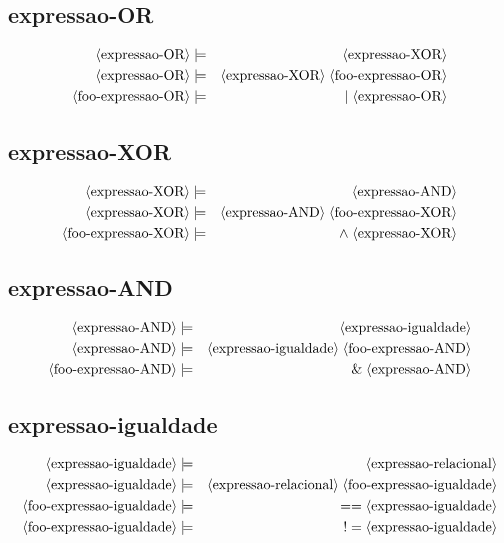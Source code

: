 \documentclass[12pt,a4papper]{article}
\newcommand{\pn}[1]{\langle \textnormal{#1} \rangle}
\newcommand{\pp}{\models}
\newcommand{\ww}{\;}
\newcommand{\sm}[1]{\textnormal{#1}}
\begin{document}
\begin{landscape}
\subsection{expressao-OR}
\begin{eqnarray}
\pn{expressao-OR} &\pp& \pn{expressao-XOR} \\
\pn{expressao-OR} &\pp& \pn{expressao-XOR} \ww \pn{foo-expressao-OR} \\
\pn{foo-expressao-OR} &\pp& \sm{$\mid$} \ww \pn{expressao-OR}
\end{eqnarray}


\subsection{expressao-XOR}
\begin{eqnarray}
\pn{expressao-XOR} &\pp& \pn{expressao-AND} \\
\pn{expressao-XOR} &\pp& \pn{expressao-AND} \ww \pn{foo-expressao-XOR} \\
\pn{foo-expressao-XOR} &\pp& \sm{$\wedge$} \ww \pn{expressao-XOR} 
\end{eqnarray}


\subsection{expressao-AND}
\begin{eqnarray}
\pn{expressao-AND} &\pp& \pn{expressao-igualdade} \\
\pn{expressao-AND} &\pp& \pn{expressao-igualdade} \ww \pn{foo-expressao-AND}\\
\pn{foo-expressao-AND} &\pp& \sm{\&} \ww \pn{expressao-AND}
\end{eqnarray}


\subsection{expressao-igualdade}
\begin{eqnarray}
\pn{expressao-igualdade} &\pp& \pn{expressao-relacional} \\
\pn{expressao-igualdade} &\pp& \pn{expressao-relacional} \ww \pn{foo-expressao-igualdade} \\
              \pn{foo-expressao-igualdade} &\pp& \sm{$==$} \ww \pn{expressao-igualdade} \\
              \pn{foo-expressao-igualdade} &\pp& \sm{$!=$} \ww \pn{expressao-igualdade}
\end{eqnarray}



\end{landscape}
\end{document}
